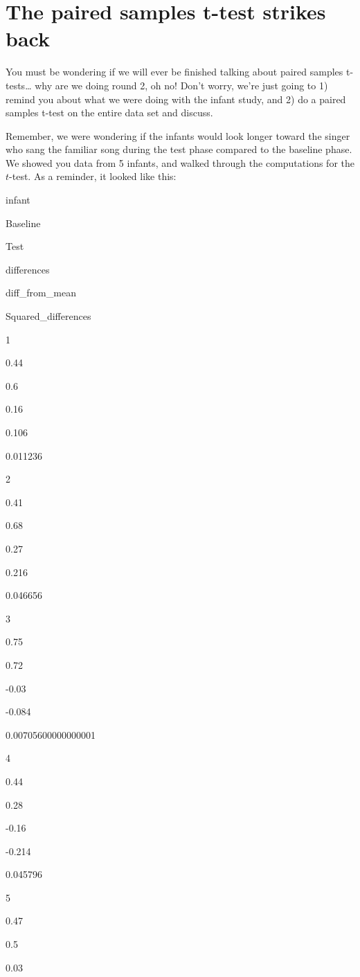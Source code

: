 \documentclass[
]{book}
\begin{document}
\hypertarget{the-paired-samples-t-test-strikes-back}{%
\section{The paired samples t-test strikes back}\label{the-paired-samples-t-test-strikes-back}}

You must be wondering if we will ever be finished talking about paired samples t-tests\ldots{} why are we doing round 2, oh no! Don't worry, we're just going to 1) remind you about what we were doing with the infant study, and 2) do a paired samples t-test on the entire data set and discuss.

Remember, we were wondering if the infants would look longer toward the singer who sang the familiar song during the test phase compared to the baseline phase. We showed you data from 5 infants, and walked through the computations for the \(t\)-test. As a reminder, it looked like this:

infant

Baseline

Test

differences

diff\_from\_mean

Squared\_differences

1

0.44

0.6

0.16

0.106

0.011236

2

0.41

0.68

0.27

0.216

0.046656

3

0.75

0.72

-0.03

-0.084

0.00705600000000001

4

0.44

0.28

-0.16

-0.214

0.045796

5

0.47

0.5

0.03
\end{document}
